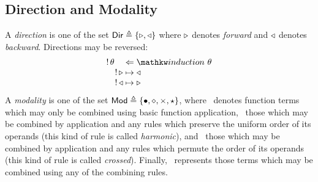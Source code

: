 \documentclass{amsart}
\begin{document}
\subsection{Direction and Modality}
A \emph{direction} is one of the set
$\mathsf{Dir}\triangleq\{\mathsf{\triangleright},\mathsf{\triangleleft}\}$ where $\mathsf{\triangleright}$
denotes \emph{forward} and $\mathsf{\triangleleft}$ denotes \emph{backward}.  Directions may
be reversed:
\[
  \arraycolsep=1.4pt
  \begin{array}{lcl}
    !\,\theta &\Leftarrow &\induction\theta\\
    \quad!\,\con\triangleright &\mapsto &\triangleleft\\
    \quad!\,\con\triangleleft &\mapsto &\triangleright
  \end{array}
\]
A \emph{modality} is one of the set $\mathsf{Mod}\triangleq\{\mathsf{\bullet}, \mathsf{\diamond},
\mathsf{\times}, \mathsf{\star}\}$, where \con\bullet\ denotes function terms
which may only be combined using basic function application,
\con\diamond\ those which may be combined by application and any rules which
preserve the uniform order of its operands (this kind of
rule is called \emph{harmonic}), and
\con\times\ those which may be combined by application and any rules
which permute the order of its operands (this kind of rule is called
\emph{crossed}). Finally, \con\star\
represents those terms which may be combined using any of the combining
rules.
\end{document}
